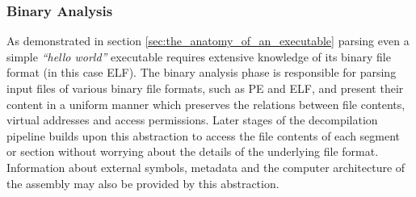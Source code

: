 
\subsubsection{Binary Analysis}
\label{sec:binary_analysis}

As demonstrated in section \ref{sec:the_anatomy_of_an_executable} parsing even a simple \textit{``hello world''} executable requires extensive knowledge of its binary file format (in this case ELF). The binary analysis phase is responsible for parsing input files of various binary file formats, such as PE and ELF, and present their content in a uniform manner which preserves the relations between file contents, virtual addresses and access permissions. Later stages of the decompilation pipeline builds upon this abstraction to access the file contents of each segment or section without worrying about the details of the underlying file format. Information about external symbols, metadata and the computer architecture of the assembly may also be provided by this abstraction.
